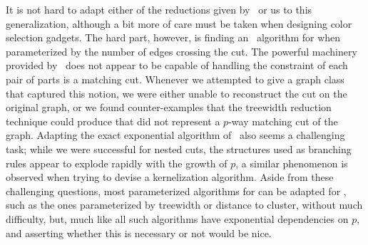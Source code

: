 
It is not hard to adapt either of the reductions given by~\cite{chvatal_matching_cut} or us to this generalization, although a bit more of care must be taken when designing color selection gadgets.
The hard part, however, is finding an \FPT\ algorithm for  when parameterized by the number of edges crossing the cut.
The powerful machinery provided by~\cite{marx_treewidth_reduction} does not appear to be capable of handling the constraint of each pair of parts is a matching cut.
Whenever we attempted to give a graph class that captured this notion, we were either unable to reconstruct the cut on the original graph, or we found counter-examples that the treewidth reduction technique could produce that did not represent a $p$-way matching cut of the graph.
Adapting the exact exponential algorithm of~\cite{matching_cut_ipec} also seems a challenging task; while we were successful for nested cuts, the structures used as branching rules appear to explode rapidly with the growth of $p$, a similar phenomenon is observed when trying to devise a kernelization algorithm.
Aside from these challenging questions, most parameterized algorithms for  can be adapted for , such as the ones parameterized by treewidth or distance to cluster, without much difficulty, but, much like  all such algorithms have exponential dependencies on $p$, and asserting whether this is necessary or not would be nice. 





